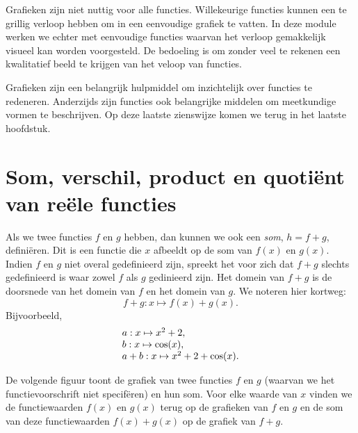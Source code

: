 Grafieken zijn niet nuttig voor alle functies. Willekeurige functies
kunnen een te grillig verloop hebben om in een eenvoudige grafiek te
vatten. In deze module werken we echter met eenvoudige functies
waarvan het verloop gemakkelijk visueel kan worden voorgesteld.
De bedoeling is om zonder veel te rekenen een kwalitatief beeld te
krijgen van het veloop van functies.

Grafieken zijn een belangrijk hulpmiddel om inzichtelijk over functies
te redeneren. Anderzijds zijn functies ook belangrijke middelen om
meetkundige vormen te beschrijven. Op deze laatste zienswijze komen we 
terug in het laatste hoofdstuk.


\section{Som, verschil, product en quoti\"ent van re\"ele functies}
\label{secsom}

Als we twee functies $f$ en $g$ hebben, dan kunnen we ook een {\em
  som}, $h=f+g$, defini\"eren. Dit is een functie die $x$ afbeeldt op
de som van $f(x)$ en $g(x)$. Indien $f$ en $g$ niet overal
gedefinieerd zijn, spreekt het voor zich dat $f+g$ slechts
gedefinieerd is waar zowel $f$ als $g$ gedinieerd zijn. Het domein van
$f+g$ is de doorsnede van het domein van $f$ en het domein van $g$.
We noteren hier kortweg:
\[
f+g:x\mapsto f(x)+g(x).
\]
Bijvoorbeeld,
\[
\ba{l}
a:x\mapsto x^2+2,\\
b:x\mapsto \cos(x),\\
a+b:x\mapsto x^2+2+\cos(x).
\ea
\]

\newpage

De volgende figuur toont de grafiek van twee functies $f$ en $g$ (waarvan we
het functievoorschrift niet specif\"eren) en hun som. Voor elke waarde
van $x$ vinden we de functiewaarden $f(x)$ en $g(x)$ terug op de
grafieken van $f$ en $g$ en de som van deze functiewaarden $f(x)+g(x)$
op de grafiek van $f+g$.

\begin{center}
\end{center}

